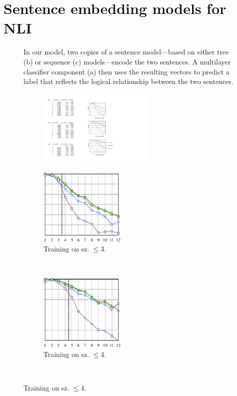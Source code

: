 \section{Sentence embedding models for NLI} \label{methods}

\begin{figure}[t]
  \centering
  
  \caption{In our model, two copies of a sentence model---based on either tree (b) or sequence (c) models---encode the two sentences. A multilayer classifier component (a) then uses the resulting vectors to predict a label that reflects the logical relationship between the two sentences.} 
  \label{sample-figure}
\end{figure}

\begin{figure}[t]
  \centering
  \begin{subfigure}[t]{0.04\textwidth}
      \includegraphics[height=1.45in]{scale.pdf}
\end{subfigure}
\begin{subfigure}[t]{0.24\textwidth}
  \includegraphics[height=1.45in]{fig3c.pdf}
  \caption{Training on sz. $\le$3.}
  \end{subfigure}~~~
\begin{subfigure}[t]{0.24\textwidth}
    \includegraphics[height=1.45in]{fig4c.pdf}
  \caption{Training on sz. $\le$4.}
  \end{subfigure}~~~~

\end{figure}
